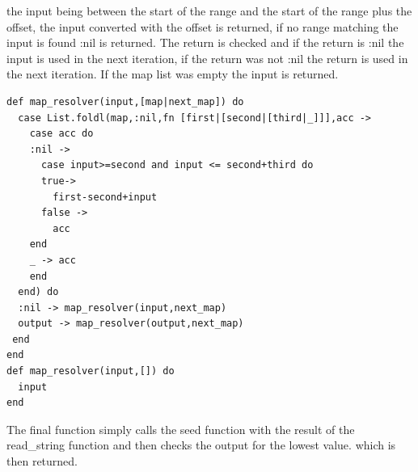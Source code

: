 \documentclass[a4paper,11pt]{article}
\begin{document}
the input being between the start of the range and the start of the range plus the offset, the input converted with the offset is returned, if no range matching the input is found :nil is returned. The return is checked and if the return is :nil the input is used in the next iteration, if the return was not :nil 
the return is used in the next iteration. If the map list was empty the input is returned.
\begin{verbatim}
def map_resolver(input,[map|next_map]) do
  case List.foldl(map,:nil,fn [first|[second|[third|_]]],acc ->
    case acc do
    :nil ->
      case input>=second and input <= second+third do
      true->
        first-second+input
      false ->
        acc
    end
    _ -> acc
    end
  end) do
  :nil -> map_resolver(input,next_map)
  output -> map_resolver(output,next_map)
 end
end
def map_resolver(input,[]) do
  input
end
\end{verbatim}
The final function simply calls the seed function with the result of the read\_string function and then checks the output for the lowest value. which is then returned.
\end{document}
